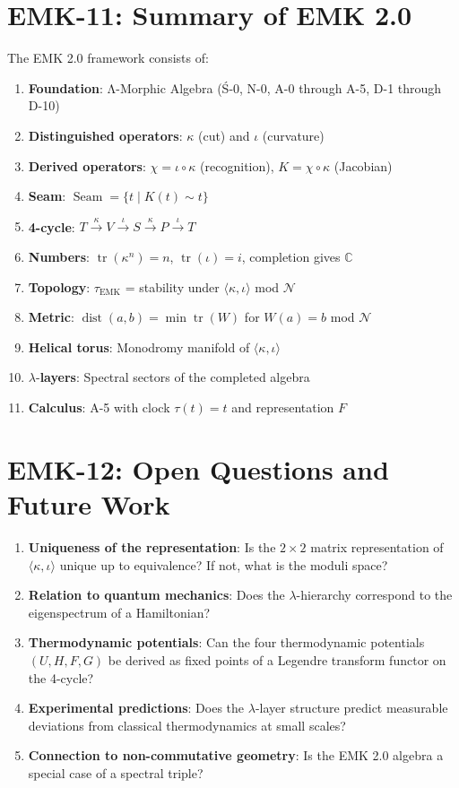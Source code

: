 \documentclass[12pt, oneside]{article}
\DeclareMathOperator{\tr}{tr}
\newcommand{\N}{\mathcal{N}}
\newcommand{\Seam}{\mathop{\mathrm{Seam}}}
\newcommand{\dist}{\mathop{\mathrm{dist}}}
\begin{document}
\section{EMK-11: Summary of EMK 2.0}

The EMK 2.0 framework consists of:

\begin{enumerate}
    \item \textbf{Foundation}: Λ-Morphic Algebra (Ś-0, N-0, A-0 through A-5, D-1 through D-10)
    \item \textbf{Distinguished operators}: $\kappa$ (cut) and $\iota$ (curvature)
    \item \textbf{Derived operators}: $\chi = \iota \circ \kappa$ (recognition), $K = \chi \circ \kappa$ (Jacobian)
    \item \textbf{Seam}: $\Seam = \{ t \mid K(t) \sim t \}$
    \item \textbf{4-cycle}: $T \xrightarrow{\kappa} V \xrightarrow{\iota} S \xrightarrow{\kappa} P \xrightarrow{\iota} T$
    \item \textbf{Numbers}: $\tr(\kappa^n) = n$, $\tr(\iota) = i$, completion gives $\mathbb{C}$
    \item \textbf{Topology}: $\tau_{\text{EMK}}$ = stability under $\langle \kappa, \iota \rangle$ mod $\N$
    \item \textbf{Metric}: $\dist(a,b) = \min \tr(W)$ for $W(a)=b$ mod $\N$
    \item \textbf{Helical torus}: Monodromy manifold of $\langle \kappa, \iota \rangle$
    \item $\lambda$-\textbf{layers}: Spectral sectors of the completed algebra
    \item \textbf{Calculus}: A-5 with clock $\tau(t)=t$ and representation $F$
\end{enumerate}

\section{EMK-12: Open Questions and Future Work}

\begin{enumerate}
    \item \textbf{Uniqueness of the representation}: Is the $2\times 2$ matrix representation of $\langle \kappa, \iota \rangle$ unique up to equivalence? If not, what is the moduli space?
    \item \textbf{Relation to quantum mechanics}: Does the $\lambda$-hierarchy correspond to the eigenspectrum of a Hamiltonian?
    \item \textbf{Thermodynamic potentials}: Can the four thermodynamic potentials $(U, H, F, G)$ be derived as fixed points of a Legendre transform functor on the 4-cycle?
    \item \textbf{Experimental predictions}: Does the $\lambda$-layer structure predict measurable deviations from classical thermodynamics at small scales?
    \item \textbf{Connection to non-commutative geometry}: Is the EMK 2.0 algebra a special case of a spectral triple?
\end{enumerate}
\end{document}
